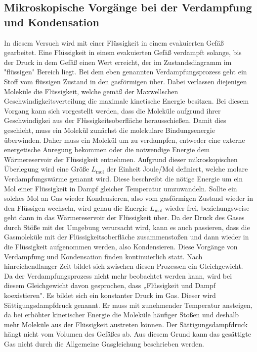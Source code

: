 \subsection{Mikroskopische Vorgänge bei der Verdampfung und Kondensation}
\label{subsec:T_VK}
In diesem Versuch wird mit einer Flüssigkeit in einem evakuierten Gefäß gearbeitet. Eine Flüssigkeit in einem evakuierten Gefäß verdampft solange, bis der Druck in dem Gefäß einen Wert erreicht,
der im Zustandsdiagramm im "flüssigen"\: Bereich liegt. Bei dem eben genannten Verdampfungsprozess
geht ein Stoff vom flüssigen Zustand in den gasförmigen über. Dabei verlassen diejenigen Moleküle die Flüssigkeit, welche gemäß der Maxwellschen Geschwindigkeitsverteilung die maximale kinetische 
Energie besitzen. Bei diesem Vorgang kann sich vorgestellt werden, dass die Moleküle aufgrund ihrer Geschwindigkei aus der Flüssigkeitsoberfläche herausschießen. Damit dies geschieht, muss
ein Molekül zunächst die molekulare Bindungsenergie überwinden. Daher muss ein Molekül um zu verdampfen, entweder eine externe energetische Anregung bekommen oder die notwendige Energie
dem Wärmereservoir der Flüssigkeit entnehmen. Aufgrund dieser mikroskopischen Überlegung wird eine Größe $L_\text{mol}$ der Einheit Joule/Mol definiert, welche 
molare Verdampfungswärme genannt wird. Diese beschreibt die nötige Energie
um ein Mol einer Flüssigkeit in Dampf gleicher Temperatur umzuwandeln. Sollte ein solches Mol an Gas wieder Kondensieren, also vom gasförmigen Zustand wieder in den Flüssigen wechseln, wird genau
die Energie $L_\text{mol}$ wieder frei, beziehungsweise geht dann in das Wärmereservoir der Flüssigkeit über. Da der Druck des Gases durch Stöße mit der Umgebung verursacht wird, kann es auch passieren, dass
die Gasmoleküle mit der Flüssigkeitsoberfläche zusammenstoßen und dann wieder in die Flüssigkeit aufgenommen werden, also Kondensieren. Diese Vorgänge von Verdampfung und 
Kondensation finden kontinuierlich statt.
Nach hinreichendlanger Zeit bildet sich zwischen diesen Prozessen ein Gleichgewicht. Da der Verdampfungsprozess nicht mehr beobachtet werden kann,
wird bei diesem Gleichgewicht davon gesprochen, dass „Flüssigkeit und Dampf koexistieren". Es bildet sich ein konstanter Druck im Gas. Dieser wird Sättigungsdampfdruck genannt. Er muss mit zunehmender Temperatur ansteigen, da bei
erhöhter kinetischer Energie die Moleküle häufiger Stoßen und deshalb mehr Moleküle aus der Flüssigkeit austreten können. Der Sättigungsdampfdruck hängt nicht vom Volumen des Gefäßes ab. 
Aus diesem Grund kann das gesättigte Gas nicht durch die Allgemeine Gasgleichung beschrieben werden.
